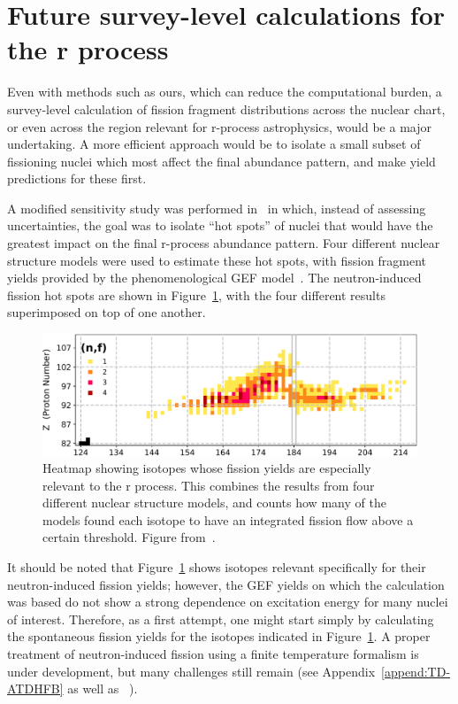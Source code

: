 \section{Future survey-level calculations for the r process}

Even with methods such as ours, which can reduce the computational burden, a survey-level calculation of fission fragment distributions across the nuclear chart, or even across the region relevant for r-process astrophysics, would be a major undertaking. A more efficient approach would be to isolate a small subset of fissioning nuclei which most affect the final abundance pattern, and make yield predictions for these first.

A modified sensitivity study was performed in~\cite{Vassh2019} in which, instead of assessing uncertainties, the goal was to isolate ``hot spots'' of nuclei that would have the greatest impact on the final r-process abundance pattern. Four different nuclear structure models were used to estimate these hot spots, with fission fragment yields provided by the phenomenological GEF model~\cite{Schmidt2016}. The neutron-induced fission hot spots are shown in Figure~\ref{fig:rprocimportant-fissions}, with the four different results superimposed on top of one another.

\begin{figure}
	\centering
	\includegraphics[width=0.7\linewidth]{TeX_files/rProc_important-fissions}
	\caption{Heatmap showing isotopes whose fission yields are especially relevant to the r process. This combines the results from four different nuclear structure models, and counts how many of the models found each isotope to have an integrated fission flow above a certain threshold. Figure from~\cite{Vassh2019}.}
	\label{fig:rprocimportant-fissions}
\end{figure}

It should be noted that Figure~\ref{fig:rprocimportant-fissions} shows isotopes relevant specifically for their neutron-induced fission yields; however, the GEF yields on which the calculation was based do not show a strong dependence on excitation energy for many nuclei of interest. Therefore, as a first attempt, one might start simply by calculating the spontaneous fission yields for the isotopes indicated in Figure~\ref{fig:rprocimportant-fissions}. A proper treatment of neutron-induced fission using a finite temperature formalism is under development, but many challenges still remain (see Appendix~\ref{append:TD-ATDHFB} as well as ~\cite{Mcdonnell2014, Schunck2014, Schunck2015b}).

